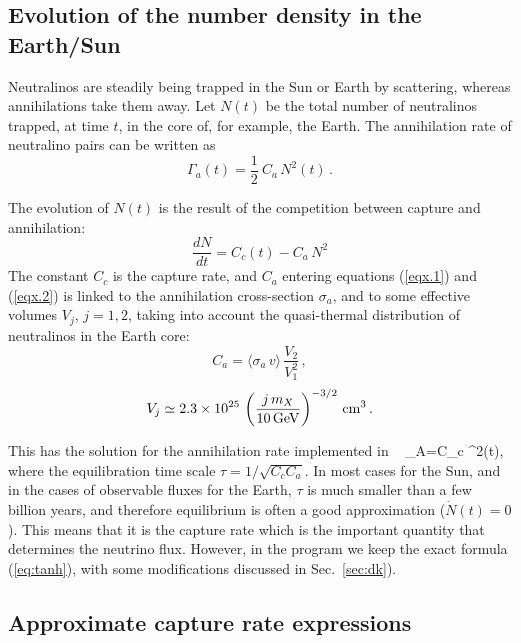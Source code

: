 \subsection{Evolution of the number density in the Earth/Sun}

Neutralinos are steadily being trapped in the Sun or Earth by
scattering, whereas annihilations take them away.
Let $N(t)$ be the total number of neutralinos trapped, at time $t$, in the core
of, for example,  the Earth.
The annihilation rate of neutralino pairs can be written as
\begin{equation}
\Gamma_a (t) = \frac{1}{2} \ C_a \, N^2 (t) \, . \label{eqx.1}
\end{equation}

The evolution of $N(t)$ is the result of the competition between capture and
annihilation:
\begin{equation}
\frac{dN}{dt} = C_c (t) - C_a \, N^2 \label{eqx.2}
\end{equation}
The constant $C_c$ is the capture rate, and
$C_a$ entering equations (\ref{eqx.1}) and (\ref{eqx.2}) is linked to
the annihilation cross-section $\sigma_a$, and to some effective volumes $V_j$,
$j=1,2$, taking into account the quasi-thermal distribution of neutralinos in
the Earth core:
\begin{equation}
C_a = \langle \sigma_a \, v \rangle \, \frac{V_2 }{ V_1^2} \, , \label{eq6.3}
\end{equation}
\begin{equation}
V_j \simeq 2.3 \times 10^{25} \, \left(\frac{j \, m_X}{ 10 \, {\rm 
GeV}}\right)^{-3/2} \, {\rm
cm}^3 \, . \label{eq6.4}
\end{equation}

This has the solution for the annihilation rate implemented in \ds\
\beq
\Gamma_A={C_c} \tanh^2\left({t\over \tau}\right),\label{eq:tanh}
\eeq
where the equilibration time scale $\tau=1/\sqrt{C_cC_a}$.  In most
cases for the Sun, and in the cases of observable fluxes for the
Earth, $\tau$ is much smaller than a few billion years, and therefore
equilibrium is often a good approximation ($\dot N(t)=0$).
This means
that it is the capture rate which is the important quantity that
determines the neutrino flux. However, in the program we keep the exact
formula (\ref{eq:tanh}), with some
modifications discussed in Sec.~\ref{sec:dk}).

\subsection{Approximate capture rate expressions}

